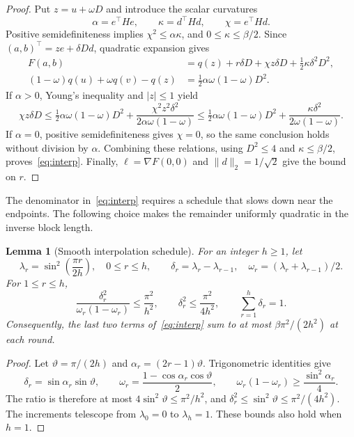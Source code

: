 \documentclass[11pt]{article}
\newtheorem{lemma}[theorem]{Lemma}
\theoremstyle{definition}
\begin{document}
\begin{proof}
Put $z=u+\omega D$ and introduce the scalar curvatures
\[
 \alpha=e^\top H e,\qquad \kappa=d^\top H d,\qquad
 \chi=e^\top H d.
\]
Positive semidefiniteness implies $\chi^2\leq\alpha\kappa$, and $0\leq\kappa\leq\beta/2$. Since $(a,b)^\top=ze+\delta Dd$, quadratic expansion gives
\begin{align*}
 F(a,b)&=q(z)+r\delta D+\chi z\delta D+\tfrac12\kappa\delta^2D^2,\\
 (1-\omega)q(u)+\omega q(v)-q(z)
 &=\tfrac12\alpha\omega(1-\omega)D^2.
\end{align*}
If $\alpha>0$, Young's inequality and $|z|\leq1$ yield
\[
 \chi z\delta D
 \leq\tfrac12\alpha\omega(1-\omega)D^2
       +\frac{\chi^2z^2\delta^2}{2\alpha\omega(1-\omega)}
 \leq\tfrac12\alpha\omega(1-\omega)D^2
       +\frac{\kappa\delta^2}{2\omega(1-\omega)}.
\]
If $\alpha=0$, positive semidefiniteness gives $\chi=0$, so the same conclusion holds without division by $\alpha$. Combining these relations, using $D^2\leq4$ and $\kappa\leq\beta/2$, proves~\eqref{eq:interp}. Finally, $\ell=\nabla F(0,0)$ and $\|d\|_2=1/\sqrt2$ give the bound on $r$.
\end{proof}

The denominator in~\eqref{eq:interp} requires a schedule that slows down near the endpoints. The following choice makes the remainder uniformly quadratic in the inverse block length.

\begin{lemma}[Smooth interpolation schedule]\label{lem:schedule}
For an integer $h\geq1$, let
\[
 \lambda_r=\sin^2\!\left(\frac{\pi r}{2h}\right),\quad 0\leq r\leq h,
 \qquad
 \delta_r=\lambda_r-\lambda_{r-1},\quad
 \omega_r=(\lambda_r+\lambda_{r-1})/2.
\]
For $1\leq r\leq h$,
\[
 \frac{\delta_r^2}{\omega_r(1-\omega_r)}\leq\frac{\pi^2}{h^2},
 \qquad \delta_r^2\leq\frac{\pi^2}{4h^2},
 \qquad \sum_{r=1}^h\delta_r=1.
\]
Consequently, the last two terms of~\eqref{eq:interp} sum to at most $\beta\pi^2/(2h^2)$ at each round.
\end{lemma}

\begin{proof}
Let $\vartheta=\pi/(2h)$ and $\alpha_r=(2r-1)\vartheta$. Trigonometric identities give
\[
 \delta_r=\sin\alpha_r\sin\vartheta,\qquad
 \omega_r=\frac{1-\cos\alpha_r\cos\vartheta}{2},\qquad
 \omega_r(1-\omega_r)\geq\frac{\sin^2\alpha_r}{4}.
\]
The ratio is therefore at most $4\sin^2\vartheta\leq\pi^2/h^2$, and $\delta_r^2\leq\sin^2\vartheta\leq\pi^2/(4h^2)$. The increments telescope from $\lambda_0=0$ to $\lambda_h=1$. These bounds also hold when $h=1$.
\end{proof}
\end{document}
